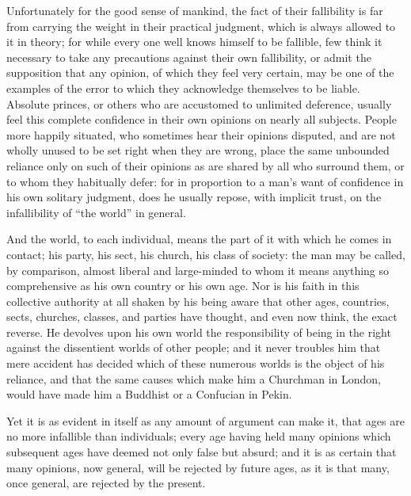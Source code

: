 Unfortunately for the good sense of mankind, the fact of their fallibility is far from carrying the weight in their practical judgment, which is always allowed to it in theory; for while every one well knows himself to be fallible, few think it necessary to take any precautions against their own fallibility, or admit the supposition that any opinion, of which they feel very certain, may be one of the examples of the error to which they acknowledge themselves to be liable. Absolute princes, or others who are accustomed to unlimited deference, usually feel this complete confidence in their own opinions on nearly all subjects. People more happily situated, who sometimes hear their opinions disputed, and are not wholly unused to be set right when they are wrong, place the same unbounded reliance only on such of their opinions as are shared by all who surround them, or to whom they habitually defer: for in proportion to a man’s want of confidence in his own solitary judgment, does he usually repose, with implicit trust, on the infallibility of “the world” in general.\par

And the world, to each individual, means the part of it with which he comes in contact; his party, his sect, his church, his class of society: the man may be called, by comparison, almost liberal and large-minded to whom it means anything so comprehensive as his own country or his own age. Nor is his faith in this collective authority at all shaken by his being aware that other ages, countries, sects, churches, classes, and parties have thought, and even now think, the exact reverse. He devolves upon his own world the responsibility of being in the right against the dissentient worlds of other people; and it never troubles him that mere accident has decided which of these numerous worlds is the object of his reliance, and that the same causes which make him a Churchman in London, would have made him a Buddhist or a Confucian in Pekin.\par

Yet it is as evident in itself as any amount of argument can make it, that ages are no more infallible than individuals; every age having held many opinions which subsequent ages have deemed not only false but absurd; and it is as certain that many opinions, now general, will be rejected by future ages, as it is that many, once general, are rejected by the present.\par

